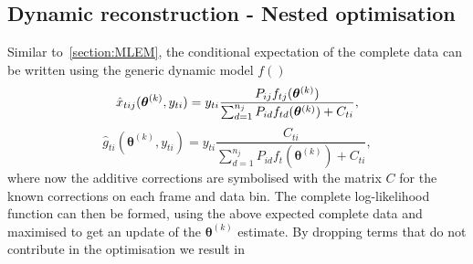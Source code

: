 \subsection{Dynamic reconstruction - Nested optimisation}
Similar to~\ref{section:MLEM}, the conditional expectation of the complete data can be written using the generic dynamic model $f()$  
\begin{equation}
\label{eq:Dynamic_complete_Data_Expectation}
\hat{x}_{tij}(\bm{\theta}^{(k)},y_{ti}) = y_{ti}
\frac{P_{ij} f_{tj}(\bm\theta^{(k)})}
{\sum_{d=1}^{n_j} P_{id} f_{td}(\bm\theta^{(k)}) + C_{ti}}\\,
\end{equation}
%
\begin{equation}
\label{eq:Dynamic_complete_Data_Expectation2}
\hat{g}_{ti}(\bm{\theta}^{(k)},y_{ti}) = y_{ti}
\frac{C_{ti}}{\sum_{d=1}^{n_j} P_{id} f_t(\bm\theta^{(k)}) + C_{ti}} ,
\end{equation}
%
where now the additive corrections are symbolised with the matrix $C$ for the known corrections on each frame and data bin.
The complete log-likelihood function can then be formed, using the above expected complete data and maximised to get an update of the $\bm\theta^{(k)}$ estimate. By dropping terms that do not contribute in the optimisation we result in
